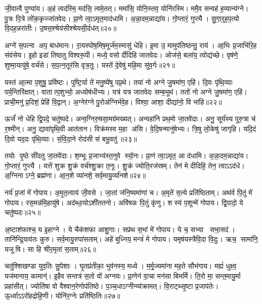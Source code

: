 जी॒वात्वै पुण्या॑य। अ॒हं त्वद॑स्मि॒ मद॑सि॒ त्वमे॒तत्। ममा॑सि॒ योनि॒स्तव॒ योनि॑रस्मि। ममै॒व सन्वह॑ ह॒व्यान्य॑ग्ने। पु॒त्रः पि॒त्रे लो॑क॒कृज्जा॑तवेदः। प्रा॒णे त्वा॒ऽमृत॒माद॑धामि। अ॒न्ना॒दम॒न्नाद्या॑य। गो॒प्तारं॒ गुप्त्यै। सु॒गा॒र्॒ह॒प॒त्यो वि॒दह॒न्नरा॑तीः। उ॒षस॒श्श्रेय॑सीश्श्रेयसी॒र्दध॑त्॥२०॥

अग्ने॑ स॒पत्ना अप॒ बाध॑मानः। रा॒यस्पोष॒मिष॒मूर्ज॑म॒स्मासु॑ धेहि। इ॒मा उ॒ मामुप॑तिष्ठन्तु॒ राय॑। आ॒भिः प्र॒जाभि॑रि॒ह संव॑सेय। इ॒हो इडा॑ तिष्ठतु विश्वरू॒पी। मध्ये॒ वसोर्दीदिहि जातवेदः। ओज॑से॒ बला॑य॒ त्वोद्य॑च्छे। वृष॑णे॒ शुष्मा॒यायु॑षे॒ वर्च॑से। स॒प॒त्न॒तूर॑सि वृत्र॒तूः। यस्ते॑ दे॒वेषु॑ महि॒मा सु॑व॒र्गः॥२१॥

यस्त॑ आ॒त्मा प॒शुषु॒ प्रवि॑ष्टः। पुष्टि॒र्या ते॑ मनु॒ष्ये॑षु पप्र॒थे। तया॑ नो अग्ने जु॒षमा॑ण॒ एहि॑। दि॒वः पृ॑थि॒व्याः पर्य॒न्तिरि॑क्षात्। वातात्प॒शुभ्यो॒ अध्योष॑धीभ्यः। यत्र॑ यत्र जातवेदः सम्ब॒भूथ॑। ततो॑ नो अग्ने जु॒षमा॑ण॒ एहि॑। प्राची॒मनु॑ प्र॒दिशं॒ प्रेहि॑ वि॒द्वान्। अ॒ग्नेर॑ग्ने पु॒रोअ॑ग्निर्भवे॒ह। विश्वा॒ आशा॒ दीद्या॑नो॒ वि भा॑हि॥२२॥

ऊर्जं॑ नो धेहि द्वि॒पदे॒ चतु॑ष्पदे। अन्व॒ग्निरु॒षसा॒मग्र॑मख्यत्। अन्वहा॑नि प्रथ॒मो जा॒तवे॑दाः। अनु॒ सूर्य॑स्य पुरु॒त्रा च॑ र॒श्मीन्। अनु॒ द्यावा॑पृथि॒वी आत॑तान। विक्र॑मस्व म॒हा अ॑सि। वे॒दि॒षन्मानु॑षेभ्यः। त्रि॒षु लो॒केषु॑ जागृहि। यदि॒दं दि॒वो यद॒दः पृ॑थि॒व्याः। सं॒वि॒दा॒ने रोद॑सी सं बभू॒वतु॑॥२३॥

तयोः पृ॒ष्ठे सी॑दतु जा॒तवे॑दाः। श॒म्भूः प्र॒जाभ्य॑स्त॒नुवे स्यो॒नः। प्रा॒णं त्वा॒ऽमृत॒ आ द॑धामि। अ॒न्ना॒दम॒न्नाद्या॑य। गो॒प्तारं॒ गुप्त्यै। यत्ते॑ शुक्र शु॒क्रं वर्च॑श्शु॒क्रा त॒नूः। शु॒क्रं ज्योति॒रज॑स्रम्। तेन॑ मे दीदिहि॒ तेन॒ त्वाऽऽद॑धे। अ॒ग्निनाऽग्ने॒ ब्रह्म॑णा। आ॒न॒शे व्या॑नशे॒ सर्व॒मायु॒र्व्या॑नशे॥२४॥

नर्य॑ प्र॒जां मे॑ गोपाय। अ॒मृ॒त॒त्वाय॑ जी॒वसे। जा॒तां ज॑नि॒ष्यमा॑णां च। अ॒मृते॑ स॒त्ये प्रति॑ष्ठिताम्। अथ॑र्व पि॒तुं मे॑ गोपाय। रस॒मन्न॑मि॒हायु॑षे। अद॑ब्धा॒योऽशी॑ततनो। अवि॑षन्नः पि॒तुं कृ॑णु। शस्य॑ प॒शून्मे॑ गोपाय। द्वि॒पादो॒ ये चतु॑ष्पदः॥२५॥

अ॒ष्टाश॑फाश्च॒ य इ॒हाग्ने। ये चैक॑शफा आशु॒गाः। सप्र॑थ स॒भां मे॑ गोपाय। ये च॒ सभ्या सभा॒सद॑। तानि॑न्द्रि॒याव॑तः कुरु। सर्व॒मायु॒रुपा॑सताम्। अहे॑ बुध्निय॒ मन्त्रं॑ मे गोपाय। यमृष॑यस्त्रैवि॒दा वि॒दुः। ऋच॒ सामा॑नि॒ यजूषि। सा हि श्रीर॒मृता॑ स॒ताम्॥२६॥

चतु॑श्शिखण्डा युव॒तिः सु॒पेशाः। घृ॒तप्र॑तीका॒ भुव॑नस्य॒ मध्ये। म॒र्मृ॒ज्यमा॑ना मह॒ते सौभ॑गाय। मह्यं॑ धुक्ष्व॒ यज॑मानाय॒ कामान्॑। इ॒हैव सन्तत्र॑ स॒तो वो॑ अग्नयः। प्रा॒णेन॑ वा॒चा मन॑सा बिभर्मि। ति॒रो मा॒ सन्त॒मायु॒र्मा प्रहा॑सीत्। ज्योति॑षा वो वैश्वान॒रेणोप॑तिष्ठे। प॒ञ्च॒धाऽग्नीन्व्य॑क्रामत्। वि॒राट्थ्सृ॒ष्टा प्र॒जाप॑तेः। ऊ॒र्ध्वाऽऽरो॑हद्रोहि॒णी। योनि॑र॒ग्नेः प्रति॑ष्ठितिः॥२७॥\anuvakamend[वि॒श॒न्तु॒ न॒ पु॒रू॒चीर्वि॑धेम नि॒धाय॒ यत्तेऽप्र॑दाहाय बृह॒त्यो ब्रह्म॑णा दुवस्यत वि॒श्ववा॑र इ॒ममृ॑ञ्जते पुरो॒गां प्रज॑नयि॒ष्यथो॑ जनि॒ष्यतेऽस्मै॒ मम॑ महि॒म्ना वर्च॑से॒ दध॑थ्सुव॒र्गो भा॑हि सम्बभू॒वतु॒रायु॒र्व्या॑नशे॒ चतु॑ष्सदः स॒तां प्र॒जाप॑ते॒र्द्वे च॑]

